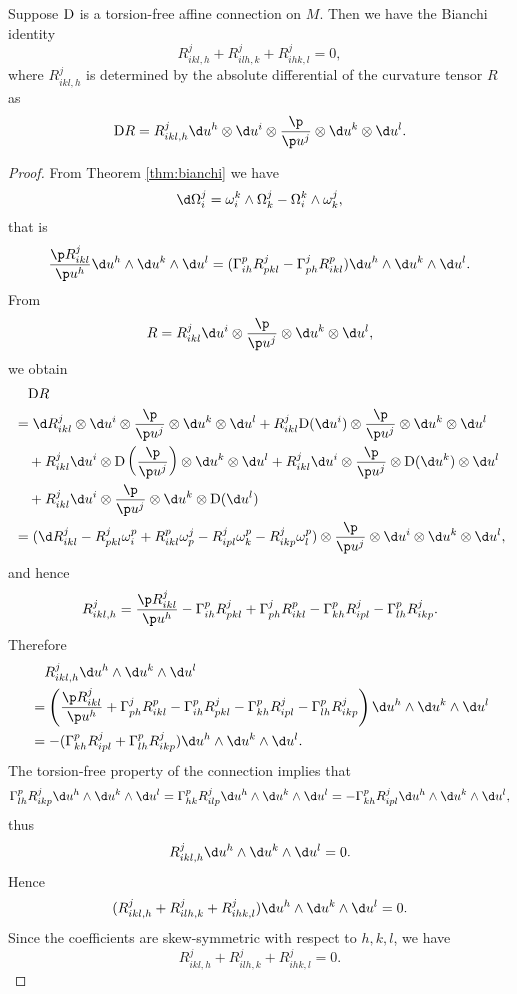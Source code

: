 \documentclass[11pt]{article}
\begin{document}
\begin{theorem}
    Suppose $\text{D}$ is a torsion-free affine connection on $M$. Then we have the Bianchi identity $$R^j_{ikl, h} + R^j_{ilh, k} + R^j_{ihk, l} = 0,$$ where $R^j_{ikl, h}$ is determined by the absolute differential of the curvature tensor $R$ as $$\D R = R^j_{ikl, h}\d u^h \otimes \d u^i \otimes \frac{\p}{\p u^j} \otimes \d u^k \otimes \d u^l.$$
\end{theorem}
\begin{proof}
    From Theorem \ref{thm:bianchi} we have $$\d\Omega^j_i = \omega^k_i \wedge \Omega^j_k - \Omega^k_i \wedge \omega^j_k,$$ that is $$\frac{\p R^j_{ikl}}{\p u^h} \d u^h \wedge \d u^k \wedge \d u^l = (\Gamma^p_{ih}R^j_{pkl} - \Gamma^j_{ph}R^p_{ikl}) \d u^h \wedge \d u^k \wedge \d u^l.$$ From $$R = R^j_{ikl} \d u^i \otimes \frac{\p}{\p u^j} \otimes \d u^k \otimes \d u^l,$$ we obtain
    \begin{align*}
        & \quad \D R \\
        &= \d R^j_{ikl} \otimes \d u^i \otimes \frac{\p}{\p u^j} \otimes \d u^k \otimes \d u^l + R^j_{ikl} \D(\d u^i) \otimes \frac{\p}{\p u^j} \otimes \d u^k \otimes \d u^l \\
        & \quad + R^j_{ikl} \d u^i \otimes \D\left(\frac{\p}{\p u^j}\right) \otimes \d u^k \otimes \d u^l + R^j_{ikl} \d u^i \otimes \frac{\p}{\p u^j} \otimes \D(\d u^k) \otimes \d u^l \\
        & \quad + R^j_{ikl} \d u^i \otimes \frac{\p}{\p u^j} \otimes \d u^k \otimes \D(\d u^l) \\
        &= (\d R^j_{ikl} - R^j_{pkl}\omega^p_i + R^p_{ikl}\omega^j_p - R^j_{ipl}\omega^p_k - R^j_{ikp}\omega^p_l) \otimes \frac{\p}{\p u^j} \otimes \d u^i \otimes \d u^k \otimes \d u^l,
    \end{align*} and hence $$R^j_{ikl, h} = \frac{\p R^j_{ikl}}{\p u^h} - \Gamma^p_{ih}R^j_{pkl} + \Gamma^j_{ph}R^p_{ikl} - \Gamma^p_{kh}R^j_{ipl} - \Gamma^p_{lh}R^j_{ikp}.$$ Therefore 
    \begin{align*}
        & \quad R^j_{ikl, h}\d u^h \wedge \d u^k \wedge \d u^l \\
        &= \left(\frac{\p R^j_{ikl}}{\p u^h} + \Gamma^j_{ph}R^p_{ikl} - \Gamma^p_{ih}R^j_{pkl} - \Gamma^p_{kh}R^j_{ipl} - \Gamma^p_{lh}R^j_{ikp}\right) \d u^h \wedge \d u^k \wedge \d u^l \\
        &= -(\Gamma^p_{kh}R^j_{ipl} + \Gamma^p_{lh}R^j_{ikp}) \d u^h \wedge \d u^k \wedge \d u^l.
    \end{align*}
    The torsion-free property of the connection implies that $$\Gamma^p_{lh}R^j_{ikp} \d u^h \wedge \d u^k \wedge \d u^l = \Gamma^p_{hk}R^j_{ilp}\d u^h \wedge \d u^k \wedge \d u^l = -\Gamma^p_{kh}R^j_{ipl} \d u^h \wedge \d u^k \wedge \d u^l,$$ thus $$R^j_{ikl, h}\d u^h \wedge \d u^k \wedge \d u^l = 0.$$ Hence $$(R^j_{ikl, h} + R^j_{ilh, k} + R^j_{ihk, l})\d u^h \wedge \d u^k \wedge \d u^l = 0.$$ Since the coefficients are skew-symmetric with respect to $h, k, l$, we have $$R^j_{ikl, h} + R^j_{ilh, k} + R^j_{ihk, l} = 0.$$
\end{proof}
\end{document}
